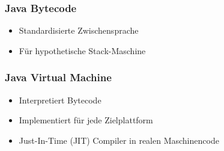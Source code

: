 \subsubsection{Java Bytecode}
\begin{itemize}
    \item Standardisierte Zwischensprache
    \item Für hypothetische Stack-Maschine
\end{itemize}

\subsubsection{Java Virtual Machine}
\begin{itemize}
    \item Interpretiert Bytecode
    \item Implementiert für jede Zielplattform
    \item Just-In-Time (JIT) Compiler in realen Maschinencode
\end{itemize}